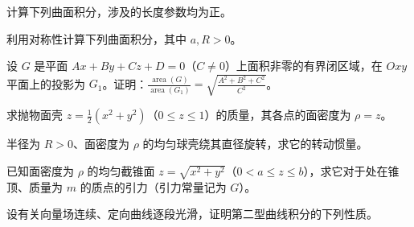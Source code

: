 \noindent\begin{minipage}{\textwidth}
计算下列曲面积分，涉及的长度参数均为正。
\end{minipage}\par\vfill
\noindent\begin{minipage}{\textwidth}
利用对称性计算下列曲面积分，其中 $a,R>0$。
\end{minipage}\par\vfill
\noindent\begin{minipage}{\textwidth}
设 $G$ 是平面 $Ax+By+Cz+D=0$（$C\ne0$）上面积非零的有界闭区域，在 $Oxy$ 平面上的投影为 $G_1$。证明：$\displaystyle\frac{\operatorname{area}(G)}{\operatorname{area}(G_1)}=\sqrt{\frac{A^2+B^2+C^2}{C^2}}$。
\end{minipage}\par\vfill
\newpage
\noindent\begin{minipage}{\textwidth}
求抛物面壳 $z=\tfrac12(x^2+y^2)$（$0\le z\le1$）的质量，其各点的面密度为 $\rho=z$。
\end{minipage}\par\vfill
\noindent\begin{minipage}{\textwidth}
半径为 $R>0$、面密度为 $\rho$ 的均匀球壳绕其直径旋转，求它的转动惯量。
\end{minipage}\par\vfill
\noindent\begin{minipage}{\textwidth}
已知面密度为 $\rho$ 的均匀截锥面 $z=\sqrt{x^2+y^2}$（$0<a\le z\le b$），求它对于处在锥顶、质量为 $m$ 的质点的引力（引力常量记为 $G$）。
\end{minipage}\par\vfill
\noindent\begin{minipage}{\textwidth}
设有关向量场连续、定向曲线逐段光滑，证明第二型曲线积分的下列性质。
\end{minipage}\par\vfill
